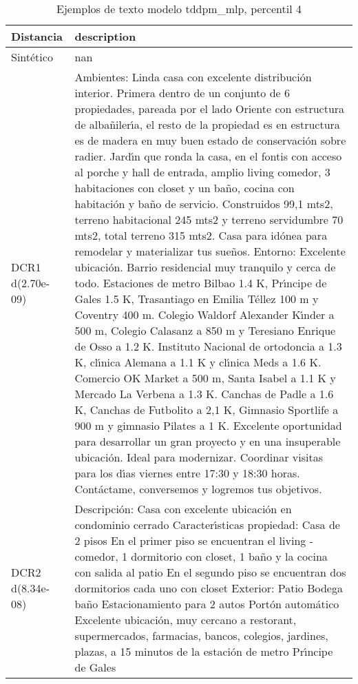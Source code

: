 \begin{table}[H]
\centering
\fontsize{10}{14}\selectfont
\caption{Ejemplos de texto modelo tddpm\_mlp, percentil 4}
\label{table-example-economicos-a-2-tddpm_mlp-4p-text}
\begin{tabular}{|l|m{35em}|}
\hline
\rowcolor[gray]{0.8}
Distancia & description \\
\hline Sintético & nan \\
\hline DCR1 d(2.70e-09) & Ambientes: Linda casa con excelente distribuci\'on interior. Primera dentro de un conjunto de 6 propiedades, pareada por el lado Oriente con estructura de alba\~niler{\'\i}a, el resto de la propiedad es en estructura es de madera en muy buen estado de conservaci\'on sobre radier. Jard{\'\i}n que ronda la casa, en el fontis con acceso al porche y hall de entrada, amplio living comedor, 3 habitaciones con closet y un ba\~no, cocina con habitaci\'on y ba\~no de servicio. Construidos 99,1 mts2, terreno habitacional 245 mts2 y terreno servidumbre 70 mts2, total terreno 315 mts2.   Casa para id\'onea para remodelar y materializar tus sue\~nos.   Entorno: Excelente ubicaci\'on. Barrio residencial muy tranquilo y cerca de todo. Estaciones de metro Bilbao 1.4 K, Pr{\'\i}ncipe de Gales 1.5 K, Trasantiago en Emilia T\'ellez 100 m y Coventry 400 m. Colegio Waldorf Alexander K{\'\i}nder a 500 m, Colegio Calasanz a 850 m y Teresiano Enrique de Osso a 1.2 K. Instituto Nacional de ortodoncia a 1.3 K, cl{\'\i}nica Alemana a 1.1 K y cl{\'\i}nica Meds a 1.6 K. Comercio OK Market a 500 m, Santa Isabel a 1.1 K y Mercado La Verbena a 1.3 K. Canchas de Padle a 1.6 K, Canchas de Futbolito a 2,1 K, Gimnasio Sportlife a 900 m y gimnasio Pilates a 1 K.  Excelente oportunidad para desarrollar un gran proyecto y en una insuperable ubicaci\'on.  Ideal para modernizar.  Coordinar visitas para los d{\'\i}as viernes entre 17:30 y 18:30 horas.  Cont\'actame, conversemos y logremos tus objetivos. \\
\hline DCR2 d(8.34e-08) & Descripci\'on:  Casa con excelente ubicaci\'on en condominio cerrado  Caracter{\'\i}sticas propiedad:  Casa de 2 pisos  En el primer piso se encuentran el living - comedor, 1 dormitorio con closet, 1 ba\~no y la cocina con salida al patio
 En el segundo piso se encuentran dos dormitorios cada uno con closet  Exterior:  Patio Bodega ba\~no Estacionamiento para 2 autos Port\'on autom\'atico   Excelente ubicaci\'on, muy cercano a restorant, supermercados, farmacias, bancos, colegios, jardines, plazas, a 15 minutos de la estaci\'on de metro Pr{\'\i}ncipe de Gales \\
\hline
\end{tabular}
\end{table}
